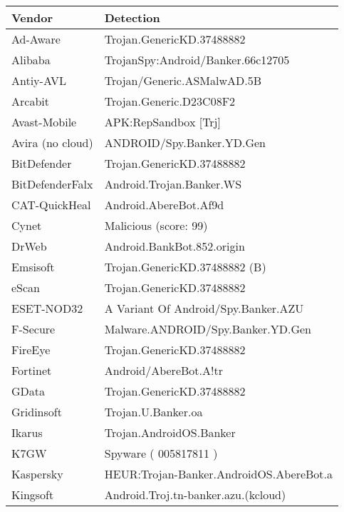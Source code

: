 \begin{tabular}{ |l|l| }
    \hline
    \textbf{Vendor} & \textbf{Detection} \\
    
    \hline
        Ad-Aware    &   Trojan.GenericKD.37488882 \\
    \hline
        Alibaba     &   TrojanSpy:Android/Banker.66c12705 \\
    \hline
        Antiy-AVL   &   Trojan/Generic.ASMalwAD.5B \\
    \hline
        Arcabit     &   Trojan.Generic.D23C08F2 \\
    \hline
        Avast-Mobile    &   APK:RepSandbox [Trj] \\
    \hline
        Avira (no cloud)    &   ANDROID/Spy.Banker.YD.Gen \\
    \hline
        BitDefender     &   Trojan.GenericKD.37488882 \\
    \hline
        BitDefenderFalx     &   Android.Trojan.Banker.WS \\
    \hline
        CAT-QuickHeal   &   Android.AbereBot.Af9d \\
    \hline
        Cynet   &   Malicious (score: 99) \\
    \hline
        DrWeb   &   Android.BankBot.852.origin \\
    \hline
        Emsisoft    &   Trojan.GenericKD.37488882 (B) \\
    \hline
        eScan   &   Trojan.GenericKD.37488882 \\
    \hline
        ESET-NOD32  &   A Variant Of Android/Spy.Banker.AZU \\
    \hline
        F-Secure    &   Malware.ANDROID/Spy.Banker.YD.Gen \\
    \hline
        FireEye     &   Trojan.GenericKD.37488882 \\
    \hline
        Fortinet    &   Android/AbereBot.A!tr \\
    \hline
        GData   &   Trojan.GenericKD.37488882 \\
    \hline
        Gridinsoft  &   Trojan.U.Banker.oa \\
    \hline
        Ikarus  &   Trojan.AndroidOS.Banker \\
    \hline
        K7GW    &   Spyware ( 005817811 ) \\
    \hline
        Kaspersky   &   HEUR:Trojan-Banker.AndroidOS.AbereBot.a \\
    \hline
        Kingsoft    &   Android.Troj.tn-banker.azu.(kcloud) \\

\end{tabular}
